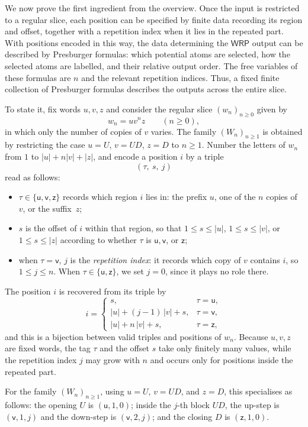 \documentclass[11pt]{article}
\theoremstyle{definition}
\newcommand{\WRP}{\mathsf{WRP}}
\begin{document}
We now prove the first ingredient from the overview.  Once the input is
restricted to a regular slice, each position can be specified by finite data
recording its region and offset, together with a repetition index when it lies
in the repeated part.  With positions encoded in this way, the data determining
the $\WRP$ output can be described by Presburger formulas: which potential atoms
are selected, how the selected atoms are labelled, and their relative output
order.  The free variables of these formulas are $n$ and the relevant repetition
indices.  Thus, a fixed finite collection of Presburger formulas describes the
outputs across the entire slice.

To state it, fix words $u,v,z$ and consider the regular slice
$(w_n)_{n\ge0}$ given by
\[
   w_n=uv^nz\qquad(n\ge 0),
\]
in which only the number of copies of $v$ varies.  The family
$(W_n)_{n\ge1}$ is obtained by restricting the case $u=U$, $v=UD$, $z=D$ to
$n\ge1$.  Number the letters of $w_n$
from $1$ to $|u|+n|v|+|z|$, and encode a position $i$ by a triple
\[
   (\tau,\ s,\ j)
\]
read as follows:
\begin{itemize}
\item $\tau\in\{\mathsf u,\mathsf v,\mathsf z\}$ records which region $i$ lies
  in: the prefix $u$, one of the $n$ copies of $v$, or the suffix~$z$;
\item $s$ is the offset of $i$ within that region, so that $1\le s\le|u|$,
  $1\le s\le|v|$, or $1\le s\le|z|$ according to whether $\tau$ is
  $\mathsf u,\mathsf v$, or $\mathsf z$;
\item when $\tau=\mathsf v$, $j$ is the \emph{repetition index}: it records
  which copy of $v$ contains $i$, so $1\le j\le n$.  When
  $\tau\in\{\mathsf u,\mathsf z\}$, we set $j=0$, since it plays no role there.
\end{itemize}
The position $i$ is recovered from its triple by
\[
   i=
   \begin{cases}
     s, & \tau=\mathsf u,\\[2pt]
     |u|+(j-1)\,|v|+s, & \tau=\mathsf v,\\[2pt]
     |u|+n\,|v|+s, & \tau=\mathsf z,
   \end{cases}
\]
and this is a bijection between valid triples and positions of $w_n$.
Because $u,v,z$ are fixed words, the tag $\tau$ and the offset $s$ take only
finitely many values, while the repetition index $j$ may grow with $n$ and
occurs only for positions inside the repeated part.

For the family $(W_n)_{n\ge1}$, using $u=U$, $v=UD$, and $z=D$, this
specialises as follows: the opening $U$ is $(\mathsf u,1,0)$; inside the $j$-th
block $UD$, the up-step is $(\mathsf v,1,j)$ and the down-step is
$(\mathsf v,2,j)$; and the closing $D$ is $(\mathsf z,1,0)$.
\end{document}

